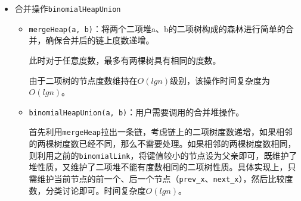 \documentclass[]{article}
\begin{document}
\begin{itemize}
\item
  合并操作\texttt{binomialHeapUnion}

  \begin{itemize}
  \item
    \texttt{mergeHeap(a,\ b)}：将两个二项堆a、b的二项树构成的森林进行简单的合并，确保合并后的链上度数递增。

    此时对于任意度数，最多有两棵树具有相同的度数。

    由于二项树的节点度数维持在\(O(lgn)\)级别，该操作时间复杂度为\(O(lgn)\)。
  \item
    \texttt{binomialHeapUnion(a,\ b)}：用户需要调用的合并堆操作。

    首先利用\texttt{mergeHeap}拉出一条链，考虑链上的二项树度数递增，如果相邻的两棵树度数已经不同，那么不需要处理。如果相邻的两棵树度数相同，则利用之前的\texttt{binomialLink}，将键值较小的节点设为父亲即可，既维护了堆性质，又维护了二项堆不能有度数相同的二项树性质。具体实现上，只需维护当前节点的前一个、后一个节点（\texttt{prev\_x}、\texttt{next\_x}），然后比较度数，分类讨论即可。时间复杂度\( O(lgn)\)。
  \end{itemize}
\end{itemize}
\end{document}
